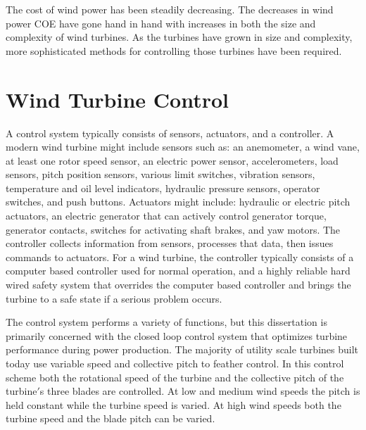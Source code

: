 The cost of wind power has been steadily decreasing.  The decreases in wind power COE have gone hand in hand with increases in both the size and complexity of wind turbines.  As the turbines have grown in size and complexity, more sophisticated methods for controlling those turbines have been required.  



\section{Wind Turbine Control} \label{section1-2} 

A control system typically consists of sensors, actuators, and a controller. A modern wind turbine might include sensors such as: an anemometer, a wind vane, at least one rotor speed sensor, an electric power sensor, accelerometers, load sensors, pitch position sensors, various limit switches, vibration sensors, temperature and oil level indicators, hydraulic pressure sensors, operator switches, and push buttons.  Actuators might include:  hydraulic or electric pitch actuators, an electric generator that can actively control generator torque, generator contacts, switches for activating shaft brakes, and yaw motors.  The controller collects information from sensors, processes that data, then issues commands to actuators. For a wind turbine, the controller typically consists of a computer based controller used for normal operation, and a highly reliable hard wired safety system that overrides the computer based controller and brings the turbine to a safe state if a serious problem occurs.\cite{burton2011}

The control system performs a variety of functions, but this dissertation is primarily concerned with the closed loop control system that optimizes turbine performance during power production. The majority of utility scale turbines built today use variable speed and collective pitch to feather control.  In this control scheme both the rotational speed of the turbine and the collective pitch of the turbine$'$s three blades are controlled. At low and medium wind speeds the pitch is held constant while the turbine speed is varied.  At high wind speeds both the turbine speed and the blade pitch can be varied.

